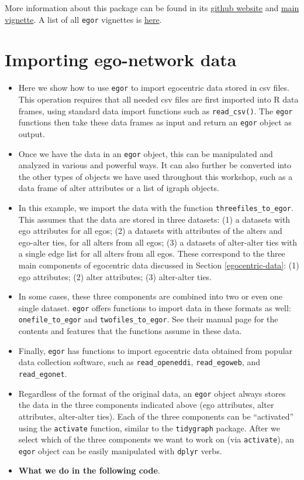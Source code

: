 \documentclass[
]{book}
\providecommand{\tightlist}{%
  \setlength{\itemsep}{0pt}\setlength{\parskip}{0pt}}
\begin{document}
More information about this package can be found in its \href{https://github.com/tilltnet/egor}{github website} and \href{https://cran.r-project.org/web/packages/egor/vignettes/using_egor.html}{main vignette}. A list of all \texttt{egor} vignettes is \href{https://cran.r-project.org/web/packages/egor/index.html}{here}.

\hypertarget{egor-import}{%
\section{Importing ego-network data}\label{egor-import}}

\begin{itemize}
\tightlist
\item
  Here we show how to use \texttt{egor} to import egocentric data stored in csv files. This operation requires that all needed csv files are first imported into R data frames, using standard data import functions such as \texttt{read\_csv()}. The \texttt{egor} functions then take these data frames as input and return an \texttt{egor} object as output.
\item
  Once we have the data in an \texttt{egor} object, this can be manipulated and analyzed in various and powerful ways. It can also further be converted into the other types of objects we have used throughout this workshop, such as a data frame of alter attributes or a list of igraph objects.
\item
  In this example, we import the data with the function \texttt{threefiles\_to\_egor}. This assumes that the data are stored in three datasets: (1) a datasets with ego attributes for all egos; (2) a datasets with attributes of the alters and ego-alter ties, for all alters from all egos; (3) a datasets of alter-alter ties with a single edge list for all alters from all egos. These correspond to the three main components of egocentric data discussed in Section \ref{egocentric-data}: (1) ego attributes; (2) alter attributes; (3) alter-alter ties.
\item
  In some cases, these three components are combined into two or even one single dataset. \texttt{egor} offers functions to import data in these formats as well: \texttt{onefile\_to\_egor} and \texttt{twofiles\_to\_egor}. See their manual page for the contents and features that the functions assume in these data.
\item
  Finally, \texttt{egor} has functions to import egocentric data obtained from popular data collection software, such as \texttt{read\_openeddi}, \texttt{read\_egoweb}, and \texttt{read\_egonet}.
\item
  Regardless of the format of the original data, an \texttt{egor} object always stores the data in the three components indicated above (ego attributes, alter attributes, alter-alter ties). Each of the three components can be ``activated'' using the \texttt{activate} function, similar to the \texttt{tidygraph} package. After we select which of the three components we want to work on (via \texttt{activate}), an \texttt{egor} object can be easily manipulated with \texttt{dplyr} verbs.
\item
  \textbf{What we do in the following code}.


\end{itemize}
\end{document}

